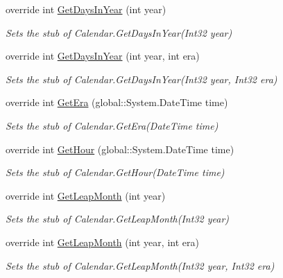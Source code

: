 \begin{DoxyCompactItemize}
override int \hyperlink{class_system_1_1_globalization_1_1_fakes_1_1_stub_calendar_acfd8d57dd8592fe9c60a152a1a2b720e}{Get\-Days\-In\-Year} (int year)
\begin{DoxyCompactList}\small\item\em Sets the stub of Calendar.\-Get\-Days\-In\-Year(\-Int32 year)\end{DoxyCompactList}\item 
override int \hyperlink{class_system_1_1_globalization_1_1_fakes_1_1_stub_calendar_a26e90a70732c4741433403e192e4e7d0}{Get\-Days\-In\-Year} (int year, int era)
\begin{DoxyCompactList}\small\item\em Sets the stub of Calendar.\-Get\-Days\-In\-Year(\-Int32 year, Int32 era)\end{DoxyCompactList}\item 
override int \hyperlink{class_system_1_1_globalization_1_1_fakes_1_1_stub_calendar_abaedbd47261c360a8fba2b11256612a3}{Get\-Era} (global\-::\-System.\-Date\-Time time)
\begin{DoxyCompactList}\small\item\em Sets the stub of Calendar.\-Get\-Era(\-Date\-Time time)\end{DoxyCompactList}\item 
override int \hyperlink{class_system_1_1_globalization_1_1_fakes_1_1_stub_calendar_a269e27813f8c1a110155ba09bbe2d5e9}{Get\-Hour} (global\-::\-System.\-Date\-Time time)
\begin{DoxyCompactList}\small\item\em Sets the stub of Calendar.\-Get\-Hour(\-Date\-Time time)\end{DoxyCompactList}\item 
override int \hyperlink{class_system_1_1_globalization_1_1_fakes_1_1_stub_calendar_a2766982ba91b6ba953fc706d7682ea4c}{Get\-Leap\-Month} (int year)
\begin{DoxyCompactList}\small\item\em Sets the stub of Calendar.\-Get\-Leap\-Month(\-Int32 year)\end{DoxyCompactList}\item 
override int \hyperlink{class_system_1_1_globalization_1_1_fakes_1_1_stub_calendar_a81d7c482baeb79bb713513a76aaafc8e}{Get\-Leap\-Month} (int year, int era)
\begin{DoxyCompactList}\small\item\em Sets the stub of Calendar.\-Get\-Leap\-Month(\-Int32 year, Int32 era)\end{DoxyCompactList}\item 

\end{DoxyCompactItemize}
